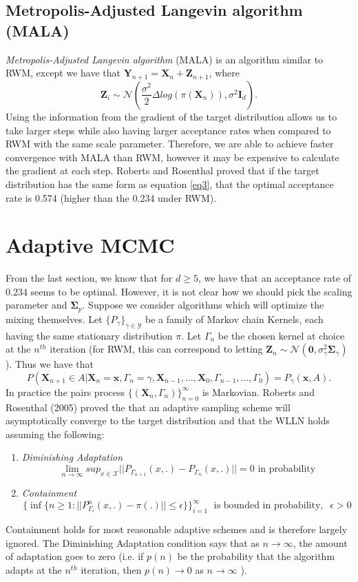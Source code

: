 \documentclass[twoside]{article}
\begin{document}
\subsection{Metropolis-Adjusted Langevin algorithm (MALA)}
\textit{Metropolis-Adjusted Langevin algorithm} (MALA) is an algorithm similar to RWM, except we have that $\mathbf{Y}_{n+1} = \mathbf{X}_n + \mathbf{Z}_{n+1}$, where $$\mathbf{Z}_i \sim \mathcal{N}(\frac{\sigma^2}{2}\Delta log( \pi(\mathbf{X}_n)), \sigma^2\mathbf{I}_d).$$
Using the information from the gradient of the target distribution allows us to take larger steps while also having larger acceptance rates when compared to RWM with the same scale parameter. Therefore, we are able to achieve faster convergence with MALA than RWM, however it may be expensive to calculate the gradient at each step. Roberts and Rosenthal proved that if the target distribution has the same form as equation \ref{eq3}, that the optimal acceptance rate is 0.574 (higher than the 0.234 under RWM).

\section{Adaptive MCMC}
From the last section, we know that for $d \ge 5$, we have that an acceptance rate of $0.234$ seems to be optimal. However, it is not clear how we should pick the scaling parameter and $\boldsymbol{\Sigma}_p$. Suppose we consider algorithms which will optimize the mixing themselves. Let $\{P_{\gamma}\}_{\gamma \in \mathcal{Y}}$ be a family of Markov chain Kernels, each having the same stationary distribution $\pi$. Let $\Gamma_n$ be the chosen kernel at choice at the $n^{th}$ iteration (for RWM, this can correspond to letting $\mathbf{Z}_{n} \sim \mathcal{N}(\mathbf{0}, \sigma^2_\gamma \boldsymbol{\Sigma}_\gamma)$). Thus we have that
$$P(\mathbf{X}_{n+1} \in A| \mathbf{X}_n = \mathbf{x}, \Gamma_n = \gamma, \mathbf{X}_{n-1}, \dots, \mathbf{X}_{0}, \Gamma_{n-1}, \dots, \Gamma_0) = P_{\gamma}(\mathbf{x},A).$$
In practice the pairs process $\{(\mathbf{X}_n, \Gamma_n)\}_{n=0}^\infty$ is Markovian.
Roberts and Rosenthal (2005) proved the that an adaptive sampling scheme will asymptotically converge to the target distribution and that the WLLN holds assuming the following:
\begin{enumerate}
	\item \textit{Diminishing Adaptation}
	$$\lim_{n \rightarrow \infty}sup_{x \in \mathcal{X}}||P_{\Gamma_{n+1}}(x,.) - P_{\Gamma_n}(x,.)|| = 0 \text{ in probability}$$
	\item \textit{Containment}
	$$\{\inf\{n\ge 1: ||P^n_{\Gamma_i}(x, .) - \pi(.)|| \le \epsilon\}\}_{i=1}^\infty \;\text{ is bounded in probability},  \;\; \epsilon > 0$$
\end{enumerate}
Containment holds for most reasonable adaptive schemes and is therefore largely ignored. The Diminishing Adaptation condition says that as $n \rightarrow \infty$, the amount of adaptation goes to zero (i.e. if $p(n)$ be the probability that the algorithm adapts at the $n^{th}$ iteration, then  $p(n) \rightarrow 0$ as $n \rightarrow \infty$ ).
\end{document}
